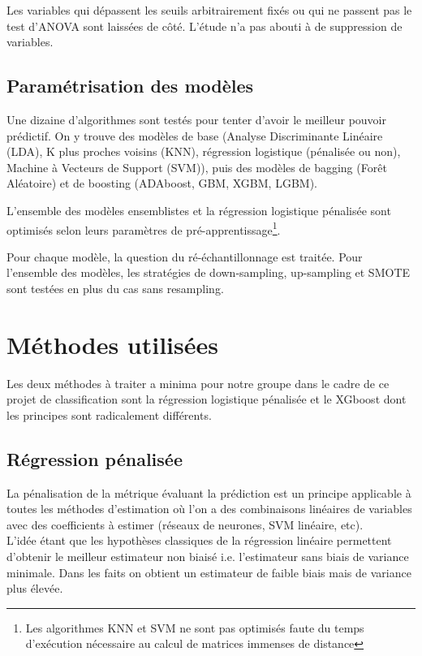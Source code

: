 \documentclass[french]{article}
\begin{document}
\begin{multicols}{2}
Les variables qui dépassent les seuils arbitrairement fixés ou qui ne passent pas le test d'ANOVA sont laissées de côté. L'étude n'a pas abouti à de suppression de variables.

\subsection{Paramétrisation des modèles}

Une dizaine d'algorithmes sont testés pour tenter d'avoir le meilleur pouvoir prédictif. On y trouve des modèles de base (Analyse Discriminante Linéaire (LDA), K plus proches voisins (KNN), régression logistique (pénalisée ou non), Machine à Vecteurs de Support (SVM)), puis des modèles de bagging (Forêt Aléatoire) et de boosting (ADAboost, GBM, XGBM, LGBM).

L'ensemble des modèles ensemblistes et la régression logistique pénalisée sont optimisés selon leurs paramètres de pré-apprentissage\footnote{Les algorithmes KNN et SVM ne sont pas optimisés faute du temps d'exécution nécessaire au calcul de matrices immenses de distance}.

Pour chaque modèle, la question du ré-échantillonnage est traitée. Pour l'ensemble des modèles, les stratégies de down-sampling, up-sampling et SMOTE sont testées en plus du cas sans resampling.





\section{Méthodes utilisées}
Les deux méthodes à traiter a minima pour notre groupe dans le cadre de ce projet de classification sont la régression logistique pénalisée et le XGboost dont les principes sont radicalement différents.


\subsection{Régression pénalisée}
La pénalisation de la métrique évaluant la prédiction est un principe applicable à toutes les méthodes d'estimation où l’on a des combinaisons linéaires de variables avec des coefficients à estimer (réseaux de neurones, SVM linéaire, etc).\\
L'idée étant que les hypothèses classiques de la régression linéaire permettent d'obtenir le meilleur estimateur non biaisé i.e. l'estimateur sans biais de variance minimale. Dans les faits on obtient un estimateur de faible biais mais de variance plus élevée.


\end{multicols}
\end{document}
